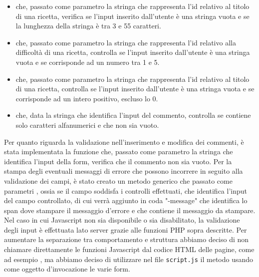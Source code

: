 \begin{itemize}
	\item {} che, passato come parametro la stringa che rappresenta l'id relativo al titolo di una ricetta, verifica se l'input inserito dall'utente è una stringa vuota e se la lunghezza della stringa è tra 3 e 55 caratteri.
	\item {} che, passato come parametro la stringa che rappresenta l'id relativo alla difficoltà di una ricetta, controlla se l'input inserito dall'utente è una stringa vuota e se corrisponde ad un numero tra 1 e 5.
	\item {} che, passato come parametro la stringa che rappresenta l'id relativo al titolo di una ricetta, controlla se l'input inserito dall'utente è una stringa vuota e se corrisponde ad un intero positivo, escluso lo 0.
	\item {} che, data la stringa che identifica l'input del commento, controlla se contiene solo caratteri alfanumerici e che non sia vuoto.
\end{itemize}
Per quanto riguarda la validazione nell'inserimento e modifica dei commenti, è stata implementata la funzione  che, passato come parametro la stringa che identifica l'input della form, verifica che il commento non sia vuoto. \newline
Per la stampa degli eventuali messaggi di errore che possono incorrere in seguito alla validazione dei campi, è stato creato un metodo generico  che passato come parametri , ossia se il campo soddisfa i controlli effettuati,  che identifica l'input del campo controllato, di cui verrà aggiunto in coda "-message" che identifica lo span dove stampare il messaggio d'errore e  che contiene il messaggio da stampare.
Nel caso in cui Javascript non sia disponibile o sia disabilitato, la validazione degli input è effettuata lato server grazie alle funzioni PHP sopra descritte.
Per aumentare la separazione tra comportamento e struttura abbiamo deciso di non chiamare direttamente le funzioni Javascript dal codice HTML delle pagine, come ad esempio , ma abbiamo deciso di utilizzare nel file \texttt{script.js} il metodo  usando come oggetto d'invocazione le varie form.

